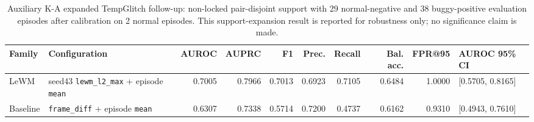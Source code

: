 \begin{table}[t]
\centering
\caption{Auxiliary K-A expanded TempGlitch follow-up: non-locked pair-disjoint support with
29 normal-negative and 38 buggy-positive evaluation episodes after calibration on 2 normal
episodes. This support-expansion result is reported for robustness only; no significance claim is
made.}
\label{tab:ka-tempglitch-expanded}
\scriptsize
\begin{tabularx}{\textwidth}{@{}lXrrrrrrrX@{}}
\toprule
Family & Configuration & AUROC & AUPRC & F1 & Prec. & Recall & Bal. acc. & FPR@95 & AUROC 95\% CI \\
\midrule
LeWM & seed43 \texttt{lewm\_l2\_max} + episode \texttt{mean} & 0.7005 & 0.7966 & 0.7013 & 0.6923 & 0.7105 & 0.6484 & 1.0000 & [0.5705, 0.8165] \\
Baseline & \texttt{frame\_diff} + episode \texttt{mean} & 0.6307 & 0.7338 & 0.5714 & 0.7200 & 0.4737 & 0.6162 & 0.9310 & [0.4943, 0.7610] \\
\bottomrule
\end{tabularx}
\end{table}
